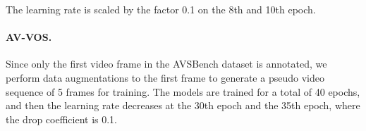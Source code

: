 \documentclass{article}
\begin{document}
The learning rate is scaled by the factor 0.1 on the 8th and 10th epoch.

\paragraph{AV-VOS.} Since only the first video frame in the AVSBench dataset is annotated, we perform data augmentations to the first frame to generate a pseudo video sequence of 5 frames for training. The models are trained for a total of 40 epochs, and then the learning rate decreases at the 30th epoch and the 35th epoch, where the drop coefficient is 0.1.
\end{document}

